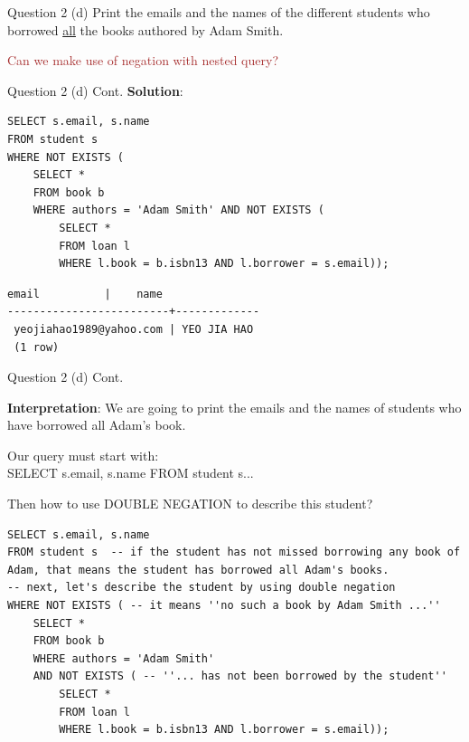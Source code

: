 \begin{frame}[fragile]{Question 2 (d)}
Print the emails and the names of the different students who borrowed \underline{all} the books authored by Adam Smith.

\textcolor{brown}{Can we make use of negation with nested query?}
\end{frame}

\begin{frame}[fragile]{Question 2 (d) Cont.}
\textbf{Solution}:
\begin{lstlisting}
SELECT s.email, s.name
FROM student s
WHERE NOT EXISTS (
	SELECT * 
	FROM book b
	WHERE authors = 'Adam Smith' AND NOT EXISTS (
		SELECT * 
		FROM loan l
		WHERE l.book = b.isbn13 AND l.borrower = s.email));
\end{lstlisting}\vspace{5pt}
\begin{lstlisting}[style=terminal]	
          email          |    name
-------------------------+-------------
 yeojiahao1989@yahoo.com | YEO JIA HAO
 (1 row)	
\end{lstlisting}
\end{frame}

\begin{frame}[fragile]{Question 2 (d) Cont.}

\textbf{Interpretation}: We are going to print the emails and the names of students who have borrowed all Adam's book.\\ \vspace{5pt}

Our query must start with:\\
SELECT s.email, s.name FROM student s... \\ \vspace{5pt}

Then how to use DOUBLE NEGATION to describe this student?

\begin{lstlisting}[style=sql-small]
SELECT s.email, s.name
FROM student s  -- if the student has not missed borrowing any book of Adam, that means the student has borrowed all Adam's books. 
-- next, let's describe the student by using double negation
WHERE NOT EXISTS ( -- it means ''no such a book by Adam Smith ...''
	SELECT * 
	FROM book b
	WHERE authors = 'Adam Smith' 
	AND NOT EXISTS ( -- ''... has not been borrowed by the student''
		SELECT * 
		FROM loan l
		WHERE l.book = b.isbn13 AND l.borrower = s.email));
\end{lstlisting}\vspace{5pt}
\end{frame}

